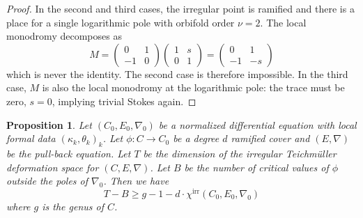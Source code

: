 \documentclass[12]{amsart}
\newtheorem{prop}[thm]{Proposition}
\begin{document}
\begin{proof}
In the second and third cases, the irregular point is ramified and there is a place for a single logarithmic pole with orbifold
order $\nu=2$. The local monodromy decomposes as
$$M=
\begin{pmatrix}0&1\\ -1&0\end{pmatrix}
\begin{pmatrix}1&s\\ 0&1\end{pmatrix}
=\begin{pmatrix}0&1\\ -1&-s\end{pmatrix}$$
which is never the identity. The second case is therefore impossible. In the third case,
$M$ is also the local monodromy at the logarithmic pole: the trace must be zero, $s=0$, implying trivial Stokes again.
\end{proof}

\begin{prop}\label{prop:bounds} Let $(C_0,E_0,\nabla_0)$ be a normalized differential equation
with local formal data $(\kappa_k,\theta_k)_k$. Let $\phi:C\to C_0$ be a degree $d$ ramified cover
and $(E,\nabla)$ be the pull-back equation. Let $T$ be the dimension of the irregular Teichm\"uller 
deformation space for $(C,E,\nabla)$. Let $B$ be the number of critical values of $\phi$ outside 
the poles of $\nabla_0$. Then we have
$$T-B\ge g-1-d\cdot\chi^{\mathrm{irr}}(C_0,E_0,\nabla_0)$$
where $g$ is the genus of $C$.
\end{prop}
\end{document}
